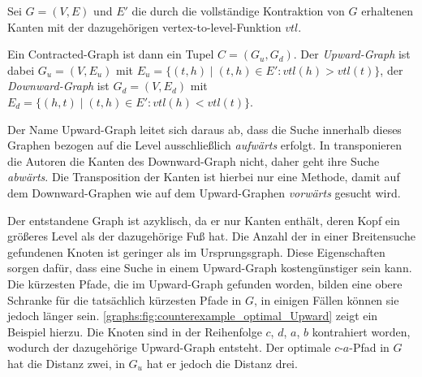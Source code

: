 \begin{definition}
  Sei $G = (V, E)$ und $E'$ die durch die vollständige Kontraktion von $G$ erhaltenen Kanten mit der dazugehörigen vertex-to-level-Funktion ${vtl}$.

  Ein Contracted-Graph ist dann ein Tupel $C = (G_u, G_d)$. Der \emph{Upward-Graph} ist dabei $G_u = (V, E_u)$ mit $E_u = \{ (t, h) \mid (t, h) \in E' \colon {vtl}(h) > {vtl}(t) \}$, der \emph{Downward-Graph} ist $G_d = (V, E_d)$ mit $E_d = \{ (h, t) \mid (t, h) \in E' \colon {vtl}(h) < {vtl}(t) \}$.
\end{definition}

Der Name Upward-Graph leitet sich daraus ab, dass die Suche innerhalb dieses Graphen bezogen auf die Level ausschließlich \emph{aufwärts} erfolgt.
In \cite{geisberger2008contraction} transponieren die Autoren die Kanten des Downward-Graph nicht, daher geht ihre Suche \emph{abwärts}.
Die Transposition der Kanten ist hierbei nur eine Methode, damit auf dem Downward-Graphen wie auf dem Upward-Graphen \emph{vorwärts} gesucht wird.

Der entstandene Graph ist azyklisch, da er nur Kanten enthält, deren Kopf ein größeres Level als der dazugehörige Fuß hat.
Die Anzahl der in einer Breitensuche gefundenen Knoten ist geringer als im Ursprungsgraph.
Diese Eigenschaften sorgen dafür, dass eine Suche in einem Upward-Graph kostengünstiger sein kann.
Die kürzesten Pfade, die im Upward-Graph gefunden worden, bilden eine obere Schranke für die tatsächlich kürzesten Pfade in $G$, in einigen Fällen können sie jedoch länger sein.
\autoref{graphs:fig:counterexample_optimal_Upward} zeigt ein Beispiel hierzu.
Die Knoten sind in der Reihenfolge $c$, $d$, $a$, $b$ kontrahiert worden, wodurch der dazugehörige Upward-Graph entsteht.
Der optimale $c$-$a$-Pfad in $G$ hat die Distanz zwei, in $G_u$ hat er jedoch die Distanz drei.

